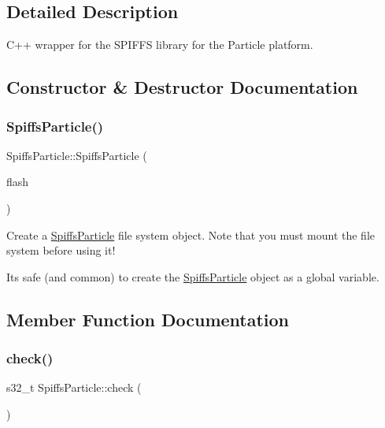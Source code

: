 \subsection{Detailed Description}
C++ wrapper for the S\+P\+I\+F\+FS library for the Particle platform. 

\subsection{Constructor \& Destructor Documentation}
\mbox{\label{class_spiffs_particle_a3c3749f4cfae7c6ef1721b84e0964a56}} 
\subsubsection{\texorpdfstring{Spiffs\+Particle()}{SpiffsParticle()}}
{\footnotesize\ttfamily Spiffs\+Particle\+::\+Spiffs\+Particle (\begin{DoxyParamCaption}\item[{Spi\+Flash\+Base \&}]{flash }\end{DoxyParamCaption})}



Create a \mbox{\hyperlink{class_spiffs_particle}{Spiffs\+Particle}} file system object. Note that you must mount the file system before using it! 

It\textquotesingle{}s safe (and common) to create the \mbox{\hyperlink{class_spiffs_particle}{Spiffs\+Particle}} object as a global variable. 

\subsection{Member Function Documentation}
\mbox{\label{class_spiffs_particle_a9ca5ff16a1168aef2d0b1aa1b1b9e1e0}} 
\subsubsection{\texorpdfstring{check()}{check()}}
{\footnotesize\ttfamily s32\+\_\+t Spiffs\+Particle\+::check (\begin{DoxyParamCaption}{ }\end{DoxyParamCaption})\hspace{0.3cm}{\ttfamily [inline]}}



